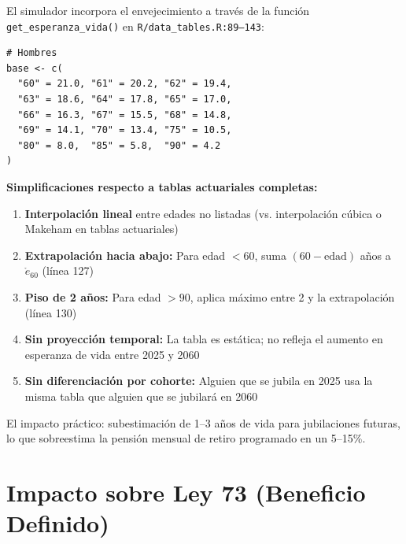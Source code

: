 \documentclass[11pt,a4paper]{report}
\begin{document}
\begin{tcolorbox}[colback=orange!5!white, colframe=orange!75!black, title=\textbf{Aplicaci\'on en C\'odigo: get\_esperanza\_vida()}, breakable]
El simulador incorpora el envejecimiento a trav\'es de la funci\'on \texttt{get\_esperanza\_vida()} en \texttt{R/data\_tables.R:89--143}:

\begin{lstlisting}[caption={Tabla de esperanza de vida simplificada (hombres)}]
# Hombres
base <- c(
  "60" = 21.0, "61" = 20.2, "62" = 19.4,
  "63" = 18.6, "64" = 17.8, "65" = 17.0,
  "66" = 16.3, "67" = 15.5, "68" = 14.8,
  "69" = 14.1, "70" = 13.4, "75" = 10.5,
  "80" = 8.0,  "85" = 5.8,  "90" = 4.2
)
\end{lstlisting}

\textbf{Simplificaciones respecto a tablas actuariales completas:}
\begin{enumerate}
  \item \textbf{Interpolaci\'on lineal} entre edades no listadas (vs. interpolaci\'on c\'ubica o Makeham en tablas actuariales)
  \item \textbf{Extrapolaci\'on hacia abajo:} Para edad $<60$, suma $(60 - \text{edad})$ a\~nos a $\mathring{e}_{60}$ (l\'inea 127)
  \item \textbf{Piso de 2 a\~nos:} Para edad $>90$, aplica m\'aximo entre 2 y la extrapolaci\'on (l\'inea 130)
  \item \textbf{Sin proyecci\'on temporal:} La tabla es est\'atica; no refleja el aumento en esperanza de vida entre 2025 y 2060
  \item \textbf{Sin diferenciaci\'on por cohorte:} Alguien que se jubila en 2025 usa la misma tabla que alguien que se jubilar\'a en 2060
\end{enumerate}

El impacto pr\'actico: subestimaci\'on de 1--3 a\~nos de vida para jubilaciones futuras, lo que sobreestima la pensi\'on mensual de retiro programado en un 5--15\%.
\end{tcolorbox}


\section{Impacto sobre Ley 73 (Beneficio Definido)}
\end{document}
